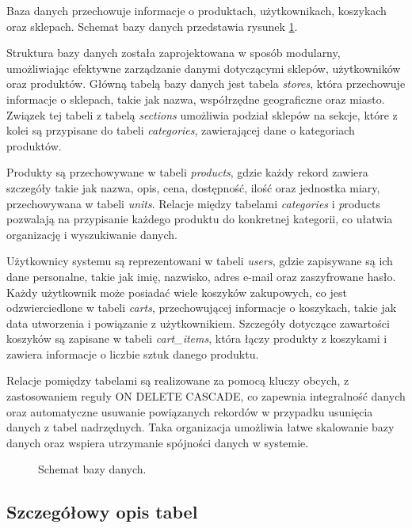 Baza danych przechowuje informacje o produktach, użytkownikach, koszykach oraz sklepach. Schemat bazy danych przedstawia rysunek \ref{fig:database}.

Struktura bazy danych została zaprojektowana w sposób modularny, umożliwiając efektywne zarządzanie danymi dotyczącymi sklepów, użytkowników oraz produktów. Główną tabelą bazy danych jest tabela \textit{stores}, która przechowuje informacje o sklepach, takie jak nazwa, współrzędne geograficzne oraz miasto. Związek tej tabeli z tabelą \textit{sections} umożliwia podział sklepów na sekcje, które z kolei są przypisane do tabeli \textit{categories}, zawierającej dane o kategoriach produktów.

Produkty są przechowywane w tabeli \textit{products}, gdzie każdy rekord zawiera szczegóły takie jak nazwa, opis, cena, dostępność, ilość oraz jednostka miary, przechowywana w tabeli \textit{units}. Relacje między tabelami \textit{categories} i \textit{p}roducts pozwalają na przypisanie każdego produktu do konkretnej kategorii, co ułatwia organizację i wyszukiwanie danych.

Użytkownicy systemu są reprezentowani w tabeli \textit{users}, gdzie zapisywane są ich dane personalne, takie jak imię, nazwisko, adres e-mail oraz zaszyfrowane hasło. Każdy użytkownik może posiadać wiele koszyków zakupowych, co jest odzwierciedlone w tabeli \textit{carts}, przechowującej informacje o koszykach, takie jak data utworzenia i powiązanie z użytkownikiem. 
Szczegóły dotyczące zawartości koszyków są zapisane w tabeli \textit{cart\_items}, która łączy produkty z koszykami i zawiera informacje o liczbie sztuk danego produktu.

Relacje pomiędzy tabelami są realizowane za pomocą kluczy obcych, z zastosowaniem reguły ON DELETE CASCADE, co zapewnia integralność danych oraz automatyczne usuwanie powiązanych rekordów w przypadku usunięcia danych z tabel nadrzędnych. Taka organizacja umożliwia łatwe skalowanie bazy danych oraz wspiera utrzymanie spójności danych w systemie.

\begin{figure}[H]
    
    \caption{Schemat bazy danych.}
    \label{fig:database}
\end{figure}

\subsection{Szczegółowy opis tabel}


